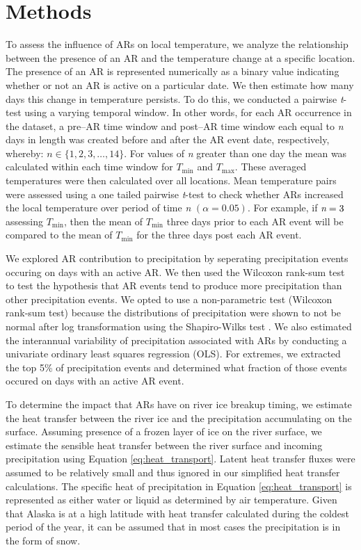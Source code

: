 \documentclass[12pts,draft]{AR_analysis_}
\begin{document}
\section{Methods}

To assess the influence of ARs on local temperature, we analyze 
the relationship between the presence of an AR and the temperature 
change at a specific location. The presence of an AR is represented 
numerically as a binary value indicating whether or not an AR is 
active on a particular date. We then estimate how many days this 
change in temperature persists. To do this, we conducted a pairwise
\emph{t}-test using a varying temporal window.
In other words, for each
AR occurrence in the dataset, a pre--AR time window and post--AR
time window each equal to \emph{n}
days in length was created before and after the AR event date, respectively,
whereby: $ n \in \{1, 2, 3, \ldots, 14\}$.
For values of \emph{n} greater than one day the mean was 
calculated within each time window
for $T_{\text{min}}$ and $T_{\text{max}}$. These averaged 
temperatures were then
calculated over all locations. Mean temperature pairs 
were assessed using a one tailed pairwise \emph{t}-test to check
whether ARs increased the local temperature over period of 
time \emph{n} $(\alpha =
0.05)$. For example, if $\emph{n} = 3$ assessing $T_{\text{min}}$,
then the mean of $T_{\text{min}}$ three days prior to each AR event
will be compared to the mean of $T_{\text{min}}$ for
the three days post each AR event.

We explored AR contribution to precipitation by seperating precipitation
events occuring on days with an active AR.
We then used the Wilcoxon rank-sum test \cite{Rey2011} to test 
the hypothesis 
that AR events tend to produce more precipitation than other
precipitation events. We opted to use a non-parametric 
test (Wilcoxon rank-sum test) 
because the distributions of precipitation were shown to
not be normal after log transformation using the
Shapiro-Wilks test \cite{shapiro_wilk_test}. We also estimated
the interannual variability of precipitation associated with ARs by
conducting a univariate ordinary least squares regression (OLS). 
For extremes, we extracted the top 5\% of precipitation events and determined 
what fraction of those events occured on days with an active AR event. 

To determine the impact that ARs have on river ice breakup timing, 
we estimate the heat transfer between the river ice and 
the precipitation accumulating on the surface. 
Assuming presence of a frozen layer of ice on the river surface, we estimate
the sensible heat transfer between the river surface and incoming
precipitation using Equation \ref{eq:heat_transport}. Latent heat
transfer fluxes were assumed to be relatively small and thus 
ignored in our simplified 
heat transfer calculations. The specific heat of precipitation in Equation
\ref{eq:heat_transport} is represented as either water or liquid as determined 
by air temperature. Given that Alaska is at a high latitude with heat transfer
calculated during the coldest period of the year, it can be assumed that 
in most cases the precipitation is in the form of snow.
\end{document}
